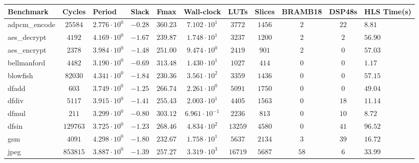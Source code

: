 \begin{tabular}{|l|c|HHc|c|c|c|c|cH|}
\hline
Benchmark     & Cycles       & Period                 & Slack     & Fmax       & Wall-clock              & LUTs      & Slices    & BRAMB18 & DSP48s  & HLS Time(s) \\
\hline
adpcm\_encode & $ 25584    $ & $ 2.776 \cdot 10^{0} $ & $ -0.28 $ & $ 360.23 $ & $ 7.102 \cdot 10^{1}  $ & $ 3772  $ & $ 1456  $ & $ 2   $ & $ 22  $ & $ 8.81    $ \\
aes\_decrypt  & $ 4192     $ & $ 4.169 \cdot 10^{0} $ & $ -1.67 $ & $ 239.87 $ & $ 1.748 \cdot 10^{1}  $ & $ 3237  $ & $ 1200  $ & $ 2   $ & $ 2   $ & $ 56.90   $ \\
aes\_encrypt  & $ 2378     $ & $ 3.984 \cdot 10^{0} $ & $ -1.48 $ & $ 251.00 $ & $ 9.474 \cdot 10^{0}  $ & $ 2419  $ & $ 901   $ & $ 2   $ & $ 0   $ & $ 57.03   $ \\
bellmanford   & $ 4482     $ & $ 3.190 \cdot 10^{0} $ & $ -0.69 $ & $ 313.48 $ & $ 1.430 \cdot 10^{1}  $ & $ 1027  $ & $ 414   $ & $ 0   $ & $ 0   $ & $ 1.17    $ \\
blowfish      & $ 82030    $ & $ 4.341 \cdot 10^{0} $ & $ -1.84 $ & $ 230.36 $ & $ 3.561 \cdot 10^{2}  $ & $ 3359  $ & $ 1436  $ & $ 0   $ & $ 0   $ & $ 57.15   $ \\
dfadd         & $ 603      $ & $ 3.749 \cdot 10^{0} $ & $ -1.25 $ & $ 266.74 $ & $ 2.261 \cdot 10^{0}  $ & $ 5091  $ & $ 1750  $ & $ 0   $ & $ 0   $ & $ 49.04   $ \\
dfdiv         & $ 5117     $ & $ 3.915 \cdot 10^{0} $ & $ -1.41 $ & $ 255.43 $ & $ 2.003 \cdot 10^{1}  $ & $ 4405  $ & $ 1563  $ & $ 0   $ & $ 18  $ & $ 11.14   $ \\
dfmul         & $ 211      $ & $ 3.299 \cdot 10^{0} $ & $ -0.80 $ & $ 303.12 $ & $ 6.961 \cdot 10^{-1} $ & $ 2236  $ & $ 813   $ & $ 0   $ & $ 10  $ & $ 8.72    $ \\
dfsin         & $ 129763   $ & $ 3.725 \cdot 10^{0} $ & $ -1.23 $ & $ 268.46 $ & $ 4.834 \cdot 10^{2}  $ & $ 13259 $ & $ 4580  $ & $ 0   $ & $ 41  $ & $ 96.52   $ \\
gsm           & $ 4091     $ & $ 4.298 \cdot 10^{0} $ & $ -1.80 $ & $ 232.67 $ & $ 1.758 \cdot 10^{1}  $ & $ 5637  $ & $ 2134  $ & $ 3   $ & $ 39  $ & $ 16.72   $ \\
jpeg          & $ 853815   $ & $ 3.887 \cdot 10^{0} $ & $ -1.39 $ & $ 257.27 $ & $ 3.319 \cdot 10^{3}  $ & $ 16719 $ & $ 5687  $ & $ 58  $ & $ 6   $ & $ 33.99   $ \\

\end{tabular}
